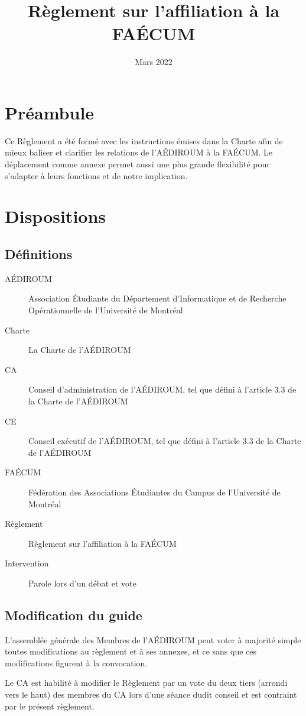 \documentclass{aediroum}
\title{Règlement sur l'affiliation à la FAÉCUM}
\date{Mars 2022}
\begin{document}
\maketitle

\section{Préambule}
Ce Règlement a été formé avec les instructions émises dans la Charte afin de mieux baliser et clarifier les relations de l'AÉDIROUM à la FAÉCUM. Le déplacement comme annexe permet aussi une plus grande flexibilité pour s'adapter à leurs fonctions et de notre implication.

\section{Dispositions}

\subsection{Définitions}
\begin{description}
	\item[AÉDIROUM] Association Étudiante du Département d'Informatique et de Recherche Opérationnelle de l'Université de Montréal
	\item[Charte] La Charte de l'AÉDIROUM
	\item[CA] Conseil d'administration de l'AÉDIROUM, tel que défini à l'article 3.3 de la Charte de l'AÉDIROUM
	\item[CE] Conseil exécutif de l'AÉDIROUM, tel que défini à l'article 3.3 de la Charte de l'AÉDIROUM
	\item[FAÉCUM] Fédération des Associations Étudiantes du Campus de l'Université de Montréal
	\item[Règlement] Règlement sur l'affiliation à la FAÉCUM
	\item[Intervention] Parole lors d'un débat et vote
\end{description}

\subsection{Modification du guide}
L'assemblée générale des Membres de l'AÉDIROUM peut voter à majorité simple toutes modifications au règlement et à ses annexes, et ce sans que ces modifications figurent à la convocation.

Le CA est habilité à modifier le Règlement par un vote du deux tiers (arrondi vers le haut) des membres du CA lors d'une séance dudit conseil et est contraint par le présent règlement.
\end{document}
